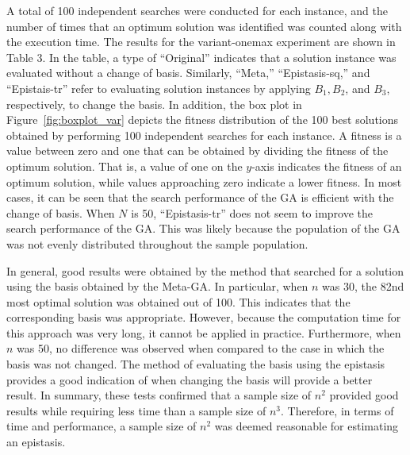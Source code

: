 A total of 100 independent searches were conducted for each instance, and the number of times that an optimum solution was identified was counted along with the execution time. The results for the variant-onemax experiment are shown in Table 3. In the table, a type of “Original” indicates that a solution instance was evaluated without a change of basis. Similarly, ``Meta,'' ``Epistasis-sq,'' and ``Epistais-tr'' refer to evaluating solution instances by applying $ B_1,B_2 $, and $ B_3 $, respectively, to change the basis. In addition, the box plot in Figure~\ref{fig:boxplot_var} depicts the fitness distribution of the 100 best solutions obtained by performing 100 independent searches for each instance. A fitness is a value between zero and one that can be obtained by dividing the fitness of the optimum solution. That is, a value of one on the $ y $-axis indicates the fitness of an optimum solution, while values approaching zero indicate a lower fitness. In most cases, it can be seen that the search performance of the GA is efficient with the change of basis. When $ N $ is 50, ``Epistasis-tr'' does not seem to improve the search performance of the GA. This was likely because the population of the GA was not evenly distributed throughout the sample population.

In general, good results were obtained by the method that searched for a solution using the basis obtained by the Meta-GA. In particular, when $ n $ was 30, the 82nd most optimal solution was obtained out of 100. This indicates that the corresponding basis was appropriate. However, because the computation time for this approach was very long, it cannot be applied in practice. Furthermore, when $ n $ was 50, no difference was observed when compared to the case in which the basis was not changed. The method of evaluating the basis using the epistasis provides a good indication of when changing the basis will provide a better result. In summary, these tests confirmed that a sample size of $ n^2 $ provided good results while requiring less time than a sample size of $ n^3 $. Therefore, in terms of time and performance, a sample size of $ n^2 $ was deemed reasonable for estimating an epistasis.


